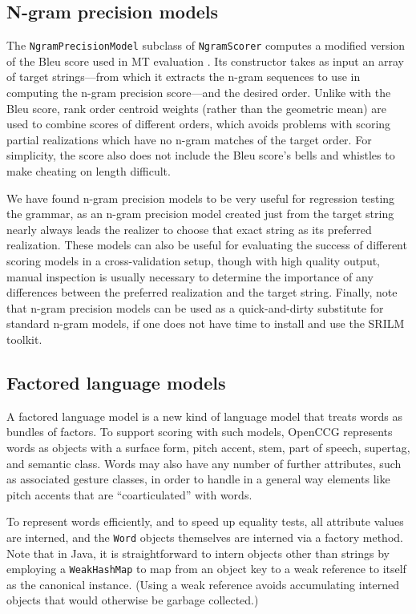 \documentclass[11pt]{article}
\newcommand{\code}[1]{\texttt{#1}} %
\begin{document}
\subsection{N-gram precision models}
\label{ngram-precision}

The \code{NgramPrecisionModel} subclass of \code{Ngram\-Scorer} computes a
modified version of the Bleu score used in MT evaluation
\cite{Bleu:2001}. Its constructor takes as input an array of target
strings---from which it extracts the n-gram sequences to use in
computing the n-gram precision score---and the desired order. Unlike
with the Bleu score, rank order centroid weights (rather than the
geometric mean) are used to combine scores of different orders, which
avoids problems with scoring partial realizations which have no n-gram
matches of the target order. For simplicity, the score also does not
include the Bleu score's bells and whistles to make cheating on length
difficult.
 
We have found n-gram precision models to be very useful for regression
testing the grammar, as an n-gram precision model created just from the
target string nearly always leads the realizer to choose that exact
string as its preferred realization. These models can also be useful for
evaluating the success of different scoring models in a cross-validation
setup, though with high quality output, manual inspection is usually
necessary to determine the importance of any differences between the
preferred realization and the target string. Finally, note that n-gram
precision models can be used as a quick-and-dirty substitute for
standard n-gram models, if one does not have time to install and use the
SRILM toolkit.

\subsection{Factored language models}

A factored language model \cite{Bilmes-Kirchoff:2003} is a new kind of
language model that treats words as bundles of factors. To support
scoring with such models, OpenCCG represents words as objects with a
surface form, pitch accent, stem, part of speech, supertag, and semantic
class. Words may also have any number of further attributes, such as
associated gesture classes, in order to handle in a general way elements
like pitch accents that are ``coarticulated'' with words. 

To represent words efficiently, and to speed up equality tests, all
attribute values are interned, and the \code{Word} objects themselves
are interned via a factory method. Note that in Java, it is
straightforward to intern objects other than strings by employing a
\code{Weak\-Hash\-Map} to map from an object key to a weak reference to
itself as the canonical instance. (Using a weak reference avoids
accumulating interned objects that would otherwise be garbage
collected.)
\end{document}
